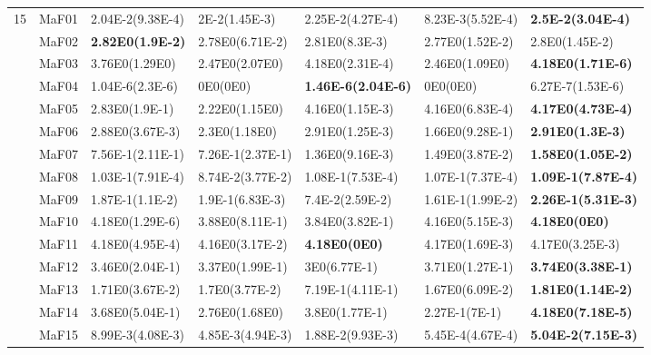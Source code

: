\documentclass[]{article}
\begin{document}
\begin{landscape}
\begin{table}
\begin{footnotesize}
\begin{tabular}{|l|l|l|l|l|l|l|}
\multirow{15}{*}{15} & MaF01 & 2.04E-2(9.38E-4) & 2E-2(1.45E-3) & \cellcolor{gray95} 2.25E-2(4.27E-4) & 8.23E-3(5.52E-4) & \cellcolor{gray95} {\bf 2.5E-2(3.04E-4)}\\
 & MaF02 & \cellcolor{gray95} {\bf 2.82E0(1.9E-2)} & \cellcolor{gray95} 2.78E0(6.71E-2) & \cellcolor{gray95} 2.81E0(8.3E-3) & 2.77E0(1.52E-2) & 2.8E0(1.45E-2)\\
 & MaF03 & \cellcolor{gray95} 3.76E0(1.29E0) & 2.47E0(2.07E0) & \cellcolor{gray95} 4.18E0(2.31E-4) & 2.46E0(1.09E0) & \cellcolor{gray95} {\bf 4.18E0(1.71E-6)}\\
 & MaF04 & \cellcolor{gray95} 1.04E-6(2.3E-6) & \cellcolor{gray95} 0E0(0E0) & \cellcolor{gray95} {\bf 1.46E-6(2.04E-6)} & \cellcolor{gray95} 0E0(0E0) & \cellcolor{gray95} 6.27E-7(1.53E-6)\\
 & MaF05 & 2.83E0(1.9E-1) & 2.22E0(1.15E0) & 4.16E0(1.15E-3) & \cellcolor{gray95} 4.16E0(6.83E-4) & \cellcolor{gray95} {\bf 4.17E0(4.73E-4)}\\
 & MaF06 & 2.88E0(3.67E-3) & 2.3E0(1.18E0) & \cellcolor{gray95} 2.91E0(1.25E-3) & 1.66E0(9.28E-1) & \cellcolor{gray95} {\bf 2.91E0(1.3E-3)}\\
 & MaF07 & 7.56E-1(2.11E-1) & 7.26E-1(2.37E-1) & 1.36E0(9.16E-3) & \cellcolor{gray95} 1.49E0(3.87E-2) & \cellcolor{gray95} {\bf 1.58E0(1.05E-2)}\\
 & MaF08 & 1.03E-1(7.91E-4) & 8.74E-2(3.77E-2) & \cellcolor{gray95} 1.08E-1(7.53E-4) & \cellcolor{gray95} 1.07E-1(7.37E-4) & \cellcolor{gray95} {\bf 1.09E-1(7.87E-4)}\\
 & MaF09 & 1.87E-1(1.1E-2) & 1.9E-1(6.83E-3) & 7.4E-2(2.59E-2) & 1.61E-1(1.99E-2) & \cellcolor{gray95} {\bf 2.26E-1(5.31E-3)}\\
 & MaF10 & \cellcolor{gray95} 4.18E0(1.29E-6) & \cellcolor{gray95} 3.88E0(8.11E-1) & 3.84E0(3.82E-1) & 4.16E0(5.15E-3) & \cellcolor{gray95} {\bf 4.18E0(0E0)}\\
 & MaF11 & \cellcolor{gray95} 4.18E0(4.95E-4) & 4.16E0(3.17E-2) & \cellcolor{gray95} {\bf 4.18E0(0E0)} & 4.17E0(1.69E-3) & 4.17E0(3.25E-3)\\
 & MaF12 & \cellcolor{gray95} 3.46E0(2.04E-1) & 3.37E0(1.99E-1) & 3E0(6.77E-1) & \cellcolor{gray95} 3.71E0(1.27E-1) & \cellcolor{gray95} {\bf 3.74E0(3.38E-1)}\\
 & MaF13 & 1.71E0(3.67E-2) & 1.7E0(3.77E-2) & 7.19E-1(4.11E-1) & 1.67E0(6.09E-2) & \cellcolor{gray95} {\bf 1.81E0(1.14E-2)}\\
 & MaF14 & 3.68E0(5.04E-1) & 2.76E0(1.68E0) & 3.8E0(1.77E-1) & 2.27E-1(7E-1) & \cellcolor{gray95} {\bf 4.18E0(7.18E-5)}\\
 & MaF15 & 8.99E-3(4.08E-3) & 4.85E-3(4.94E-3) & 1.88E-2(9.93E-3) & 5.45E-4(4.67E-4) & \cellcolor{gray95} {\bf 5.04E-2(7.15E-3)}\\
\hline
\end{tabular}
\end{footnotesize}
\end{table}
\end{landscape}
\end{document}
